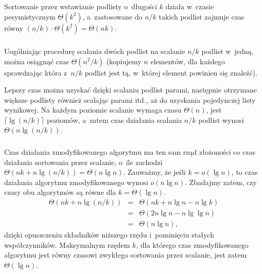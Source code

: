 \problems

\subsection{} %

\subsubsection{} %
Sortowanie przez wstawianie podlisty o~długości $k$ działa w~czasie pesymistycznym $\Theta(k^2)$, a~zastosowane do $n/k$ takich podlist zajmuje czas równy $(n/k)\cdot\Theta(k^2)=\Theta(nk)$.

\subsubsection{} %
Uogólniając procedurę scalania dwóch podlist na scalanie $n/k$ podlist w~jedną, można osiągnąć czas $\Theta(n^2\!/k)$ (kopiujemy $n$ elementów, dla każdego sprawdzając która z~$n/k$ podlist jest tą, w~której element powinien się znaleźć).

Lepszy czas można uzyskać dzięki scalaniu podlist parami, następnie otrzymane większe podlisty również scalając parami itd., aż do uzyskania pojedynczej listy wynikowej. Na każdym poziomie scalanie wymaga czasu $\Theta(n)$, jest $\lceil\lg(n/k)\rceil$ poziomów, a~zatem czas działania scalania $n/k$ podlist wynosi $\Theta(n\lg(n/k))$.

\subsubsection{} %
Czas działania zmodyfikowanego algorytmu ma ten sam rząd złożoności co czas działania sortowania przez scalanie, o~ile zachodzi $\Theta(nk+n\lg(n/k))=\Theta(n\lg n)$. Zauważmy, że jeśli $k=o(\lg n)$, to czas działania algorytmu zmodyfikowanego wynosi $o(n\lg n)$. Zbadajmy zatem, czy czasy obu algorytmów są równe dla $k=\Theta(\lg n)$.
\begin{eqnarray*}
	\Theta(nk+n\lg(n/k)) &=& \Theta(nk+n\lg n-n\lg k) \\
	&=& \Theta(2n\lg n-n\lg\lg n) \\
	&=& \Theta(n\lg n),
\end{eqnarray*}
dzięki opuszczeniu składników niższego rzędu i~pominięciu stałych współczynników. Maksymalnym rzędem $k$, dla którego czas zmodyfikowanego algorytmu jest równy czasowi zwykłego sortowania przez scalanie, jest zatem $\Theta(\lg n)$.

